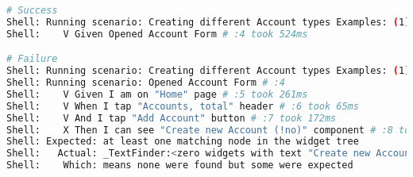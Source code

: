 \begin{lstlisting}[language=bash]
# Success
Shell: Running scenario: Creating different Account types Examples: (1) # :3
Shell:    V Given Opened Account Form # :4 took 524ms

# Failure
Shell: Running scenario: Creating different Account types Examples: (1) # :3
Shell: Running scenario: Opened Account Form # :4
Shell:    V Given I am on "Home" page # :5 took 261ms
Shell:    V When I tap "Accounts, total" header # :6 took 65ms
Shell:    V And I tap "Add Account" button # :7 took 172ms
Shell:    X Then I can see "Create new Account (!no)" component # :8 took 4ms  
Shell: Expected: at least one matching node in the widget tree
Shell:   Actual: _TextFinder:<zero widgets with text "Create new Account (!no)" (ignoring offstage widgets)>
Shell:    Which: means none were found but some were expected
\end{lstlisting}
